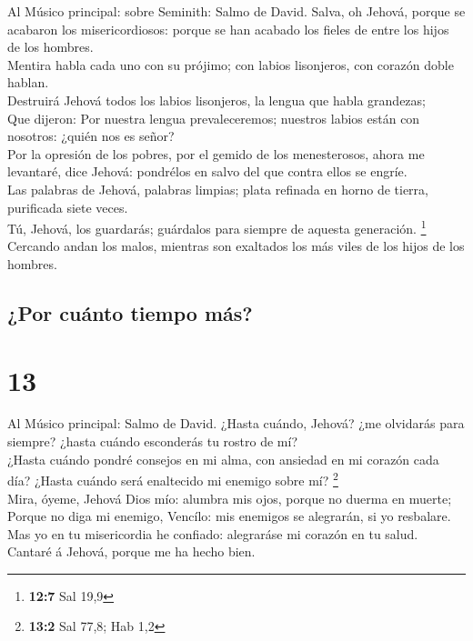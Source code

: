  Al Músico principal: sobre Seminith: Salmo de David. Salva,
oh Jehová, porque se acabaron los misericordiosos: porque se han acabado
los fieles de entre los hijos de los hombres.\\
 Mentira habla cada uno con su prójimo; con labios
lisonjeros, con corazón doble hablan.\\
 Destruirá Jehová todos los labios lisonjeros, la lengua que
habla grandezas;\\
 Que dijeron: Por nuestra lengua prevaleceremos; nuestros
labios están con nosotros: ¿quién nos es señor?\\
 Por la opresión de los pobres, por el gemido de los
menesterosos, ahora me levantaré, dice Jehová: pondrélos en salvo del
que contra ellos se engríe.\\
 Las palabras de Jehová, palabras limpias; plata refinada en
horno de tierra, purificada siete veces.\\
 Tú, Jehová, los guardarás; guárdalos para siempre de
aquesta generación. \footnote{\textbf{12:7} Sal 19,9}\\
 Cercando andan los malos, mientras son exaltados los más
viles de los hijos de los hombres.

\hypertarget{por-cuuxe1nto-tiempo-muxe1s}{%
\subsection{¿Por cuánto tiempo más?}\label{por-cuuxe1nto-tiempo-muxe1s}}

\hypertarget{section-12}{%
\section{13}\label{section-12}}

 Al Músico principal: Salmo de David. ¿Hasta cuándo, Jehová?
¿me olvidarás para siempre? ¿hasta cuándo esconderás tu rostro de mí?\\
 ¿Hasta cuándo pondré consejos en mi alma, con ansiedad en
mi corazón cada día? ¿Hasta cuándo será enaltecido mi enemigo sobre mí?
\footnote{\textbf{13:2} Sal 77,8; Hab 1,2}\\
 Mira, óyeme, Jehová Dios mío: alumbra mis ojos, porque no
duerma en muerte;\\
 Porque no diga mi enemigo, Vencílo: mis enemigos se
alegrarán, si yo resbalare.\\
 Mas yo en tu misericordia he confiado: alegraráse mi
corazón en tu salud.\\
 Cantaré á Jehová, porque me ha hecho bien.

